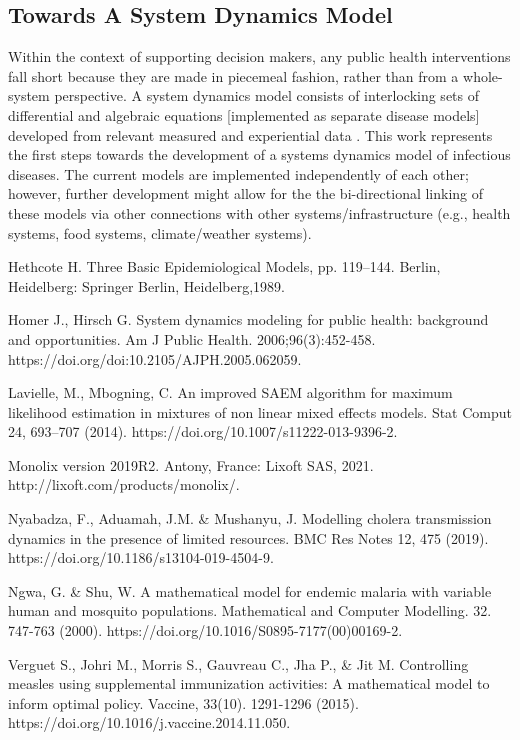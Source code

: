 \documentclass[letter,12pt, usenames,dvipsnames]{article}
\begin{document}
\subsection{Towards A System Dynamics Model}
Within the context of supporting decision makers, any public health interventions fall short because they are made in piecemeal fashion, rather than from a whole-system perspective. A system dynamics model consists of interlocking sets of differential and algebraic equations [implemented as separate disease models] developed from relevant measured and experiential data \cite{systemsdynamics}.  This work represents the first steps towards the development of a systems dynamics model of infectious diseases.  The current models are implemented independently of each other; however, further development might allow for the the bi-directional linking of these models via other connections with other systems/infrastructure (e.g., health systems, food systems, climate/weather systems).

\clearpage

\begin{thebibliography}{alpha}
 Hethcote H. Three Basic Epidemiological Models, pp. 119–144. Berlin, Heidelberg: Springer Berlin, Heidelberg,1989.


Homer J., Hirsch G. System dynamics modeling for public health: background and opportunities. Am J Public Health. 2006;96(3):452-458. https://doi.org/doi:10.2105/AJPH.2005.062059.

 Lavielle, M., Mbogning, C. An improved SAEM algorithm for maximum likelihood estimation in mixtures of non linear mixed effects models. Stat Comput 24, 693–707 (2014). https://doi.org/10.1007/s11222-013-9396-2.

 Monolix version 2019R2. Antony, France: Lixoft SAS, 2021.
http://lixoft.com/products/monolix/.

Nyabadza, F., Aduamah, J.M. \& Mushanyu, J. Modelling cholera transmission dynamics in the presence of limited resources. BMC Res Notes 12, 475 (2019). https://doi.org/10.1186/s13104-019-4504-9.

 Ngwa, G. \& Shu, W. A mathematical model for endemic malaria with variable human and mosquito populations. Mathematical and Computer Modelling. 32. 747-763 (2000). https://doi.org/10.1016/S0895-7177(00)00169-2. 

 Verguet S., Johri M., Morris S., Gauvreau C., Jha P., \& Jit M. Controlling measles using supplemental immunization activities: A mathematical model to inform optimal policy. Vaccine, 33(10). 1291-1296 (2015). https://doi.org/10.1016/j.vaccine.2014.11.050.

\end{thebibliography}
\end{document}
